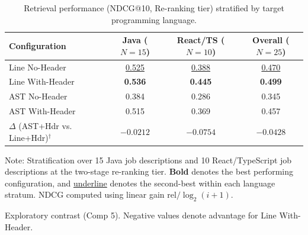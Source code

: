 \begin{table}[t]
\caption{Retrieval performance (NDCG@10, Re-ranking tier) stratified by target programming language.}
\label{tab:language_stratification}
\centering\footnotesize
\setlength{\tabcolsep}{10pt}
\begin{threeparttable}
\begin{tabular}{@{}lccc@{}}
\toprule
Configuration & Java ($N=15$) & React/TS ($N=10$) & Overall ($N=25$) \\
\midrule
Line No-Header & \underline{0.525} & \underline{0.388} & \underline{0.470} \\
Line With-Header & \textbf{0.536} & \textbf{0.445} & \textbf{0.499} \\
AST No-Header & 0.384 & 0.286 & 0.345 \\
AST With-Header & 0.515 & 0.369 & 0.457 \\
\midrule
$\Delta$ (AST+Hdr vs. Line+Hdr)$^{\dagger}$ & $-0.0212$ & $-0.0754$ & $-0.0428$ \\
\bottomrule
\end{tabular}
\begin{tablenotes}\footnotesize
\item[] Note: Stratification over 15 Java job descriptions and 10 React/TypeScript job descriptions at the two-stage re-ranking tier. \textbf{Bold} denotes the best performing configuration, and \underline{underline} denotes the second-best within each language stratum. NDCG computed using linear gain $\mathrm{rel}/\log_2(i+1)$.
\item[$^{\dagger}$] Exploratory contrast (Comp 5). Negative values denote advantage for Line With-Header.
\end{tablenotes}
\end{threeparttable}
\end{table}